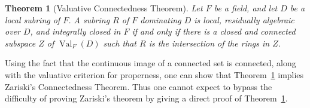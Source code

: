 \documentclass[preprint, 11pt,nonatbib]{elsarticle}
\DeclareMathOperator{\Dom}{Val}
\DeclareMathOperator{\Spec}{Spec}
\DeclareMathOperator{\Zar}{Zar}
\newtheorem{theorem}{Theorem}
\theoremstyle{definition}
\numberwithin{theorem}{section}
\begin{document}
\begin{theorem}[Valuative Connectedness Theorem]\label{ValuativeConnectednessTheorem}
Let $F$ be a field, and let $D$ be a local subring of $F$.
A subring $R$ of $F$ dominating $D$ is local, residually algebraic over $D$, and integrally closed in $F$ if and only if there is a closed and connected subspace $Z$ of $\Dom_F(D)$ such that $R$ is the intersection of the rings in $Z$.
\end{theorem} 

 






Using the fact that the continuous image of a connected set is connected, along with the valuative criterion for properness, one can show that Theorem~\ref{ValuativeConnectednessTheorem} implies Zariski's Connectedness Theorem.
Thus one cannot expect to bypass the difficulty of proving Zariski's theorem by giving a direct proof of Theorem~\ref{ValuativeConnectednessTheorem}.
 
 
%
\end{document}
